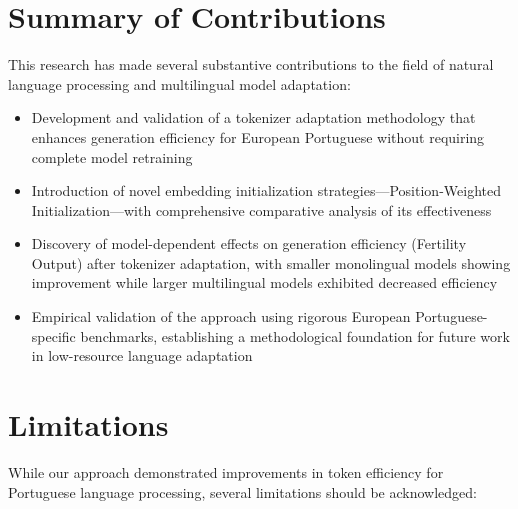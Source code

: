 \section{Summary of Contributions}
This research has made several substantive contributions to the field of natural language processing and multilingual model adaptation:

\begin{itemize}
    \item Development and validation of a tokenizer adaptation methodology that enhances generation efficiency for European Portuguese without requiring complete model retraining
    
    \item Introduction of novel embedding initialization strategies—Position-Weighted Initialization—with comprehensive comparative analysis of its effectiveness
    
    \item Discovery of model-dependent effects on generation efficiency (Fertility Output) after tokenizer adaptation, with smaller monolingual models showing improvement while larger multilingual models exhibited decreased efficiency
    
    \item Empirical validation of the approach using rigorous European Portuguese-specific benchmarks, establishing a methodological foundation for future work in low-resource language adaptation
\end{itemize}

\section{Limitations}
While our approach demonstrated improvements in token efficiency for Portuguese language processing, several limitations should be acknowledged:

